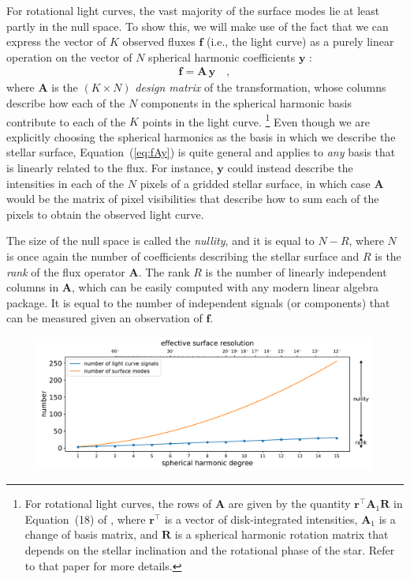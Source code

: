 \documentclass[modern]{aastex62}
\begin{document}
For rotational light curves,
the vast majority of the surface modes lie at least partly in the null
space. To show this, we will make use of the fact that we can express
the vector of $K$ observed fluxes $\mathbf{f}$ (i.e., the light curve)
as a purely linear operation on the vector of $N$
spherical harmonic coefficients $\mathbf{y}$ \citep{Luger2019}:
%
\begin{align}
    \label{eq:fAy}
    \mathbf{f} = \mathbf{A} \, \mathbf{y}
    \quad,
\end{align}
%
where $\mathbf{A}$ is the $(K \times N)$ \emph{design matrix} of the transformation, whose columns
describe how each of the $N$ components in the spherical harmonic basis contribute
to each of the $K$ points in the light curve.%
\footnote{%
    For rotational light curves, the rows of $\mathbf{A}$ are given by the
    quantity $\mathbf{r}^\top \mathbf{A}_1 \mathbf{R}$ in Equation~(18) of
    \citet{Luger2019}, where $\mathbf{r}^\top$ is a vector of disk-integrated
    intensities, $\mathbf{A}_1$ is a change of basis matrix, and $\mathbf{R}$
    is a spherical harmonic rotation matrix that depends on the stellar inclination
    and the rotational phase of the star. Refer to that paper for more details.
}
%
Even though we are explicitly choosing the spherical harmonics as the basis in which
we describe the stellar surface, Equation~(\ref{eq:fAy}) is quite general and applies to
\emph{any} basis that is linearly related to the flux. For instance, $\mathbf{y}$
could instead describe the intensities in each of the $N$ pixels of a gridded stellar
surface, in which case $\mathbf{A}$ would be the matrix of pixel visibilities that describe
how to sum each of the pixels to obtain the observed light curve.

The size of the null space is called the \emph{nullity}, and it is equal to
$N - R$, where $N$ is once again the number of coefficients describing the
stellar surface and $R$ is the \emph{rank} of the flux operator $\mathbf{A}$.
The rank $R$ is the number of linearly independent columns in $\mathbf{A}$, which
can be easily computed with any modern linear algebra package. It is equal
to the number of independent signals (or components) that can be measured given
an observation of $\mathbf{f}$.

\begin{figure}[t!]
    \begin{centering}
        \includegraphics[width=0.65\linewidth]{figures/rank.pdf}
    \end{centering}
\end{figure}
\end{document}
